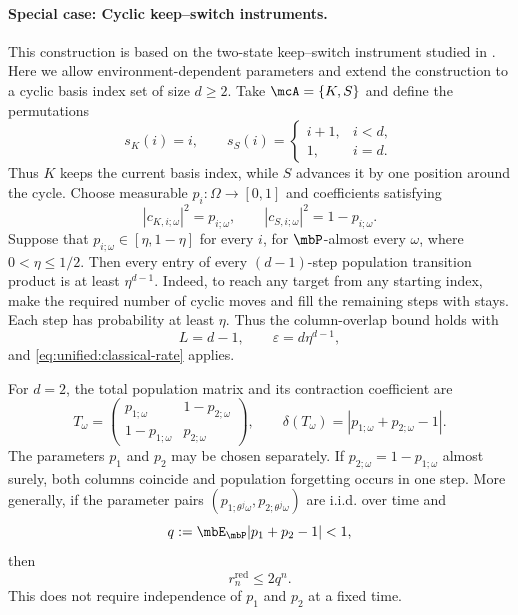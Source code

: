 \documentclass[a4paper]{article}
\numberwithin{equation}{section}   %
\theoremstyle{plain}   %
\theoremstyle{plain}   %
\theoremstyle{examplestyle}
\DeclareMathOperator{\pr}{\mbP}           %
\begin{document}
        \paragraph{Special case: Cyclic keep--switch instruments.}
        \label{par:cyclic-keep-switch}
            This construction is based on the two-state keep--switch instrument studied in \cite[Section~2.1.2]{Benoist_2021}.
            Here we allow environment-dependent parameters and extend the construction to a cyclic basis index set of size $d\ge2$.
            Take $\mcA=\{K,S\}$ and define the permutations
            \[
                 s_K(i)=i,
                 \qquad
                 s_S(i)=
                 \begin{cases}
                  i+1, & i<d,\\
                  1, & i=d.
                 \end{cases}
            \]
            Thus $K$ keeps the current basis index, while $S$ advances it by one position around the cycle.
            Choose measurable $p_i:\Omega\to[0,1]$ and coefficients satisfying
            \[
                 |c_{K,i;\omega}|^2=p_{i;\omega},
                 \qquad
                 |c_{S,i;\omega}|^2=1-p_{i;\omega}.
            \]
            Suppose that $p_{i;\omega}\in[\eta,1-\eta]$ for every $i$, for $\pr$-almost every $\omega$, where $0<\eta\le1/2$.
            Then every entry of every $(d-1)$-step population transition product is at least $\eta^{d-1}$.
            Indeed, to reach any target from any starting index, make the required number of cyclic moves and fill the remaining steps with stays. 
            Each step has probability at least $\eta$. 
            Thus the column-overlap bound holds with
            \[
                 L=d-1,
                 \qquad
                 \varepsilon=d\eta^{d-1},
            \]
            and \eqref{eq:unified:classical-rate} applies.
    
            For $d=2$, the total population matrix and its contraction
            coefficient are
            \[
                 T_\omega=
                 \begin{pmatrix}
                  p_{1;\omega}&1-p_{2;\omega}\\
                  1-p_{1;\omega}&p_{2;\omega}
                 \end{pmatrix},
                 \qquad
                 \delta(T_\omega)=|p_{1;\omega}+p_{2;\omega}-1|.
            \]
            The parameters $p_1$ and $p_2$ may be chosen separately.
            If $p_{2;\omega}=1-p_{1;\omega}$ almost surely, both columns coincide and population forgetting occurs in one step.
            More generally, if the parameter pairs $(p_{1;\theta^j\omega},p_{2;\theta^j\omega})$ are i.i.d. over time and
            \[
                 q:=\mbE_{\pr}|p_1+p_2-1|<1,
            \]
            then
            \[
             r_n^{\mathrm{red}}\le2q^n.
            \]
            This does not require independence of $p_1$ and $p_2$ at a fixed time.
    
\end{document}

